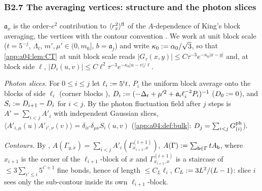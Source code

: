 
\subsubsection*{B2.7 The averaging vertices: structure and the photon slices}

$\mathfrak a_x$ is the order-$e^2$ contribution to $\langle r_x^2\rangle^{\mathrm{fl}}$ of the $A$-dependence of King's block averaging, the vertices \cite[(3.24)--(3.26)]{K1} with the contour convention \cite[(2.19), (3.27)]{K1}. We work at unit block scale ($t=5^{-j}$, $\Lambda_t$, $m',\mu'\in(0,m_0]$, $b=\mathfrak a_j$) and write $\kappa_0:=\alpha_0/\sqrt3$, so that \cref{app:a04:lem:CT} at unit block scale reads $|G_\tau(x,y)|\le C\tau^{-3}e^{-\kappa_0|x-y|}$ and, at block side $\ell$, $|D_i(u,v)|\le C\ell^2\tau^{-3}e^{-\kappa_0|u-v|/\ell}$.

\emph{Photon slices.} For $0\le i\le j$ let $\ell_i:=5^it$, $P_i$ the uniform block average onto the blocks of side $\ell_i$ (corner blocks \cite[(2.12)]{K1}), $D_i:=(-\Delta_t+\mu'^2+\mathfrak a_i\ell_i^{-2}P_i)^{-1}$ ($D_0:=0$), and $S_i:= D_{i+1}-D_i$ for $i<j$. By \cite[(2.17)--(2.18)]{K1} the photon fluctuation field after $j$ steps is $A'=\sum_{i<j}A'_i$ with independent Gaussian slices, $\langle A'_{i,\mu}(u)A'_{i',\nu}(v)\rangle=\delta_{ii'}\delta_{\mu\nu}S_i(u,v)$ (\cref{app:a04:def:bulk}: $D_j=\sum_{i<j}G^{\mathrm{ph}}_{(i)}$).

\emph{Contours.} By \cite[(2.19)]{K1}, $A(\Gamma_{y,x})=\sum_{i<j}A'_i(\Gamma^{(i+1)}_{x_{i+1},x})$, $A(\Gamma):=\sum_{\mathsf b\in\Gamma}tA_{\mathsf b}$, where $x_{i+1}$ is the corner of the $\ell_{i+1}$-block of $x$ and $\Gamma^{(i+1)}_{x_{i+1},x}$ is a staircase of $\le3\sum_{i'\le i}5^{i'+1}$ fine bonds, hence of length $\le C_L\ell_i$, $C_L:=3L^2/(L-1)$: slice $i$ sees only the sub-contour inside its own $\ell_{i+1}$-block.

